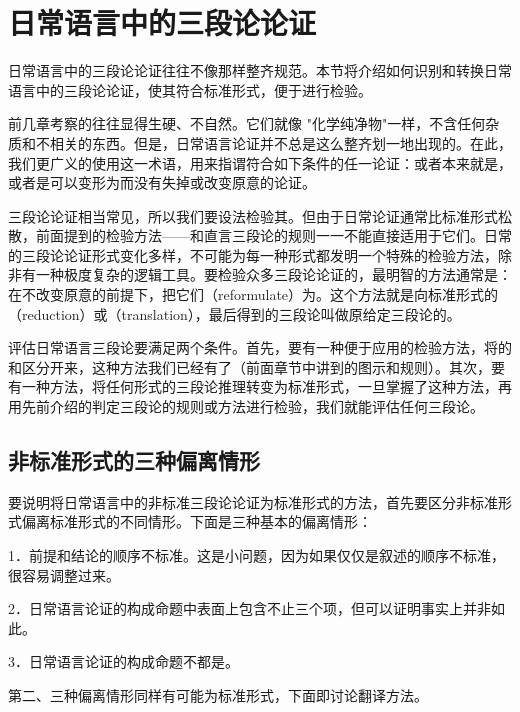 \section{日常语言中的三段论论证}

\begin{logicbox}[title=引言]
日常语言中的三段论论证往往不像那样整齐规范。本节将介绍如何识别和转换日常语言中的三段论论证，使其符合标准形式，便于进行检验。
\end{logicbox}

前几章考察的往往显得生硬、不自然。它们就像 "化学纯净物"一样，不含任何杂质和不相关的东西。但是，日常语言论证并不总是这么整齐划一地出现的。在此，我们更广义的使用这一术语，用来指谓符合如下条件的任一论证：或者本来就是，或者是可以变形为而没有失掉或改变原意的论证。

\begin{theorembox}[title=日常语言三段论的检验方法]
三段论论证相当常见，所以我们要设法检验其。但由于日常论证通常比标准形式松散，前面提到的检验方法——和直言三段论的规则一一不能直接适用于它们。日常的三段论论证形式变化多样，不可能为每一种形式都发明一个特殊的检验方法，除非有一种极度复杂的逻辑工具。要检验众多三段论论证的，最明智的方法通常是：在不改变原意的前提下，把它们（reformulate）为。这个方法就是向标准形式的（reduction）或（translation），最后得到的三段论叫做原给定三段论的。
\end{theorembox}

评估日常语言三段论要满足两个条件。首先，要有一种便于应用的检验方法，将的和区分开来，这种方法我们已经有了（前面章节中讲到的图示和规则）。其次，要有一种方法，将任何形式的三段论推理转变为标准形式，一旦掌握了这种方法，再用先前介绍的判定三段论的规则或方法进行检验，我们就能评估任何三段论。

\subsection{非标准形式的三种偏离情形}

\begin{examplebox}[title=非标准形式的三种偏离情形]
要说明将日常语言中的非标准三段论论证为标准形式的方法，首先要区分非标准形式偏离标准形式的不同情形。下面是三种基本的偏离情形：

1．前提和结论的顺序不标准。这是小问题，因为如果仅仅是叙述的顺序不标准，很容易调整过来。

2．日常语言论证的构成命题中表面上包含不止三个项，但可以证明事实上并非如此。

3．日常语言论证的构成命题不都是。

第二、三种偏离情形同样有可能为标准形式，下面即讨论翻译方法。
\end{examplebox}

